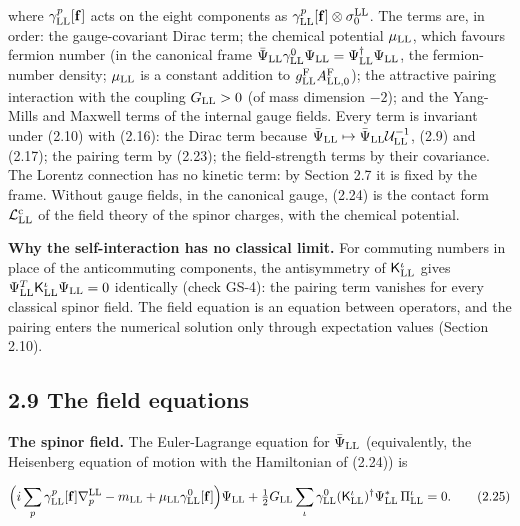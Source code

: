 \documentclass[
  10pt,
]{article}
\begin{document}
where \(\gamma^p_{\rm LL}[\mathbf f]\) acts on the eight components as
\(\gamma^p_{\rm LL}[\mathbf f]\otimes\sigma^{\rm LL}_0\). The terms are,
in order: the gauge-covariant Dirac term; the chemical potential
\(\mu_{\rm LL}\), which favours fermion number (in the canonical frame
\(\bar\Psi_{\rm LL}\gamma^0_{\rm LL}\Psi_{\rm LL}=\Psi^\dagger_{\rm LL}\Psi_{\rm LL}\),
the fermion-number density; \(\mu_{\rm LL}\) is a constant addition to
\(g^{\rm F}_{\rm LL}A^{\rm F}_{{\rm LL},0}\)); the attractive pairing
interaction with the coupling \(G_{\rm LL}>0\) (of mass dimension
\(-2\)); and the Yang-Mills and Maxwell terms of the internal gauge
fields. Every term is invariant under (2.10) with (2.16): the Dirac term
because
\(\bar\Psi_{\rm LL}\mapsto\bar\Psi_{\rm LL}\mathcal U^{-1}_{\rm LL}\),
(2.9) and (2.17); the pairing term by (2.23); the field-strength terms
by their covariance. The Lorentz connection has no kinetic term: by
Section 2.7 it is fixed by the frame. Without gauge fields, in the
canonical gauge, (2.24) is the contact form
\(\mathcal L^{\rm c}_{\rm LL}\) of the field theory of the spinor
charges, with the chemical potential.

\textbf{Why the self-interaction has no classical limit.} For commuting
numbers in place of the anticommuting components, the antisymmetry of
\(\mathsf K^\iota_{\rm LL}\) gives
\(\Psi^T_{\rm LL}\mathsf K^\iota_{\rm LL}\Psi_{\rm LL}=0\) identically
(check GS-4): the pairing term vanishes for every classical spinor
field. The field equation is an equation between operators, and the
pairing enters the numerical solution only through expectation values
(Section 2.10).

\hypertarget{the-field-equations}{%
\subsection{2.9 The field equations}\label{the-field-equations}}

\textbf{The spinor field.} The Euler-Lagrange equation for
\(\bar\Psi_{\rm LL}\) (equivalently, the Heisenberg equation of motion
with the Hamiltonian of (2.24)) is

\[\Big(i\sum_p\gamma^p_{\rm LL}[\mathbf f]\nabla^{\rm LL}_p-m_{\rm LL}+\mu_{\rm LL}\gamma^0_{\rm LL}[\mathbf f]\Big)\Psi_{\rm LL}+\tfrac12G_{\rm LL}\sum_\iota\gamma^0_{\rm LL}(\mathsf K^\iota_{\rm LL})^\dagger\Psi^*_{\rm LL}\,\Pi^\iota_{\rm LL}=0.\tag{2.25}\]
\end{document}
